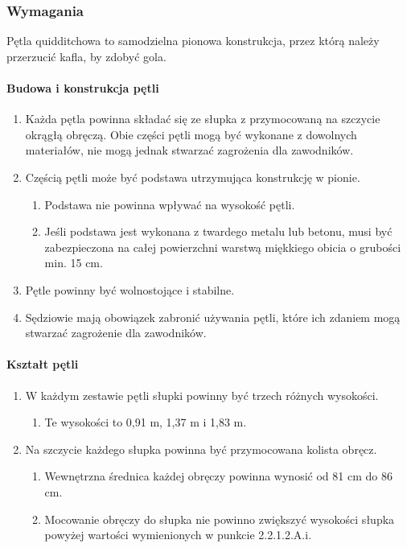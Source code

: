 \documentclass[12pt]{article}
\begin{document}
\subsubsection{Wymagania}
Pętla quidditchowa to samodzielna pionowa
konstrukcja, przez którą należy przerzucić kafla, by zdobyć gola.

\paragraph{Budowa i konstrukcja pętli}
\begin{enumerate}
	\item Każda pętla powinna składać się ze słupka z przymocowaną na szczycie
	      okrągłą obręczą. Obie części pętli mogą być wykonane z dowolnych
	      materiałów, nie mogą jednak stwarzać zagrożenia dla zawodników.

	\item Częścią pętli może być podstawa utrzymująca konstrukcję w pionie.
	      \begin{enumerate}
		      \item Podstawa nie powinna wpływać na wysokość pętli.

		      \item Jeśli podstawa jest wykonana z twardego metalu lub betonu, musi być
		            zabezpieczona na całej powierzchni warstwą miękkiego obicia o grubości
		            min. 15 cm.
	      \end{enumerate}

	\item Pętle powinny być wolnostojące i stabilne.

	\item Sędziowie mają obowiązek zabronić używania pętli, które ich zdaniem
	      mogą stwarzać zagrożenie dla zawodników.
\end{enumerate}

\paragraph{Kształt pętli}
\begin{enumerate}
	\item W każdym zestawie pętli słupki powinny być trzech różnych wysokości.
	      \begin{enumerate}
		      \item Te wysokości to 0,91 m, 1,37 m i 1,83 m.
	      \end{enumerate}
	\item Na szczycie każdego słupka powinna być przymocowana kolista obręcz.
	      \begin{enumerate}
		      \item Wewnętrzna średnica każdej obręczy powinna wynosić od 81 cm do 86 cm.

		      \item Mocowanie obręczy do słupka nie powinno zwiększyć wysokości słupka
		            powyżej wartości wymienionych w punkcie 2.2.1.2.A.i.
	      \end{enumerate}
\end{enumerate}
\end{document}
